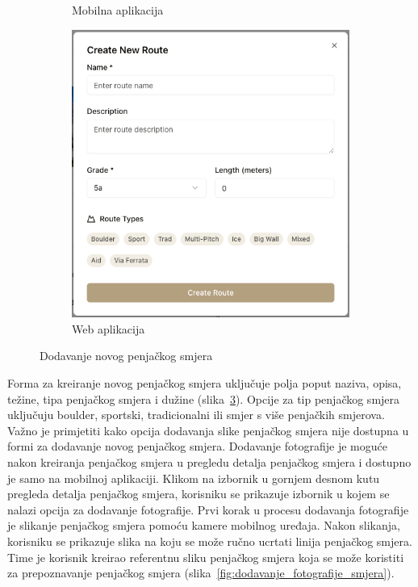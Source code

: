 \begin{figure}[H]
\begin{subfigure}[b]{0.38\textwidth}
        \caption{Mobilna aplikacija}
        \label{fig:dodavanje_smjera_mob}
    \end{subfigure}
    \hfill
    \begin{subfigure}[b]{0.55\textwidth}
        \centering
        \includegraphics[width=\textwidth]{images/implementacija/web/editing-options/create-route.png}
        \caption{Web aplikacija}
        \label{fig:dodavanje_smjera_web}
    \end{subfigure}
    \caption{Dodavanje novog penjačkog smjera}
    \label{fig:dodavanje_smjera}
\end{figure}

Forma za kreiranje novog penjačkog smjera uključuje polja poput naziva, opisa, težine, tipa penjačkog smjera i dužine (slika~\ref{fig:dodavanje_smjera}). Opcije za tip penjačkog smjera uključuju boulder, sportski, tradicionalni ili smjer s više penjačkih smjerova. 
Važno je primjetiti kako opcija dodavanja slike penjačkog smjera nije dostupna u formi za dodavanje novog penjačkog smjera. Dodavanje fotografije je moguće nakon kreiranja penjačkog smjera u pregledu detalja penjačkog smjera i dostupno je samo na mobilnoj aplikaciji. Klikom na izbornik u gornjem desnom kutu pregleda detalja penjačkog smjera, korisniku se prikazuje izbornik u kojem se nalazi opcija za dodavanje fotografije. Prvi korak u procesu dodavanja fotografije je slikanje penjačkog smjera pomoću kamere mobilnog uređaja. Nakon slikanja, korisniku se prikazuje slika na koju se može ručno ucrtati linija penjačkog smjera. Time je korisnik kreirao referentnu sliku penjačkog smjera koja se može koristiti za prepoznavanje penjačkog smjera (slika~\ref{fig:dodavanje_fotografije_smjera}).

